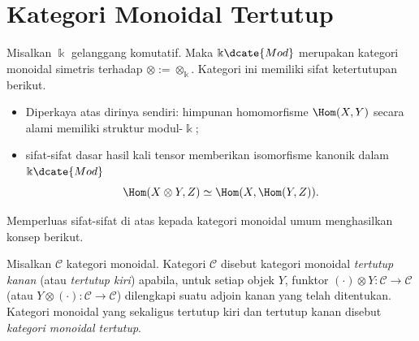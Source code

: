 
\section{Kategori Monoidal Tertutup}\label{sec:closed-monoidal}
\hypertarget{o014.aljabr2.chapter7.closed-monoidal-categories}{ }

Misalkan $\Bbbk$ gelanggang komutatif. Maka $\Bbbk\dcate{Mod}$ merupakan
kategori monoidal simetris terhadap $\otimes:=\otimes_{\Bbbk}$. Kategori ini
memiliki sifat ketertutupan berikut.
\begin{itemize}
	\item Diperkaya atas dirinya sendiri: himpunan homomorfisme
	$\Hom(X,Y)$ secara alami memiliki struktur modul-$\Bbbk$;
	\item sifat-sifat dasar hasil kali tensor memberikan isomorfisme kanonik
	dalam $\Bbbk\dcate{Mod}$
	\[ \Hom(X \otimes Y, Z) \simeq \Hom(X, \Hom(Y, Z)). \]
\end{itemize}

Memperluas sifat-sifat di atas kepada kategori monoidal umum menghasilkan
konsep berikut.

\begin{definition}\label{def:closed-monoidal-cat}
	Misalkan $\mathcal{C}$ kategori monoidal. Kategori $\mathcal{C}$ disebut
	kategori monoidal \emph{tertutup kanan} (atau \emph{tertutup kiri}) apabila,
	untuk setiap objek $Y$, funktor
	$(\cdot)\otimes Y:\mathcal{C}\to\mathcal{C}$ (atau
	$Y\otimes(\cdot):\mathcal{C}\to\mathcal{C}$) dilengkapi suatu adjoin kanan
	yang telah ditentukan. Kategori monoidal yang sekaligus tertutup kiri dan
	tertutup kanan disebut \emph{kategori monoidal tertutup}.
\end{definition}

